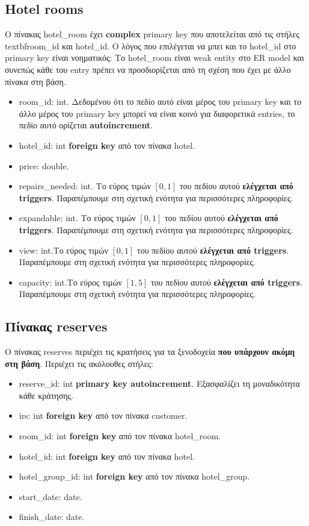 \documentclass[a4paper,oneside, 11pt]{article}
\begin{document}
\subsection{Hotel rooms}
Ο πίνακας hotel\_room έχει \textbf{complex} primary key που αποτελείται από τις στήλες \\textbf{room\_id και hotel\_id}. Ο λόγος που επιλέγεται να μπει και το hotel\_id στο primary key είναι νοηματικός: Το hotel\_room είναι weak entity στο ER model και συνεπώς κάθε του entry πρέπει να προσδιορίζεται από τη σχέση που έχει με άλλο πίνακα στη βάση.
\begin{itemize}
\item room\_id: int. Δεδομένου ότι το πεδίο αυτό είναι μέρος του primary key και το άλλο μέρος του primary key μπορεί να είναι κοινό για διαφορετικά entries, το πεδίο αυτό ορίζεται\textbf{ autoincrement}.
\item hotel\_id: int \textbf{foreign key} από τον πίνακα hotel.
\item price: double.
\item repairs\_needed: int. Το εύρος τιμών $[0,1]$ του πεδίου αυτού \textbf{ελέγχεται από triggers}. Παραπέμπουμε στη σχετική ενότητα για περισσότερες πληροφορίες.
\item expandable: int. Το εύρος τιμών $[0,1]$ του πεδίου αυτού \textbf{ελέγχεται από triggers}. Παραπέμπουμε στη σχετική ενότητα για περισσότερες πληροφορίες.
\item view: int.Το εύρος τιμών $[0,1]$ του πεδίου αυτού \textbf{ελέγχεται από triggers}. Παραπέμπουμε στη σχετική ενότητα για περισσότερες πληροφορίες.
\item capacity: int.Το εύρος τιμών $[1,5]$ του πεδίου αυτού \textbf{ελέγχεται από triggers}. Παραπέμπουμε στη σχετική ενότητα για περισσότερες πληροφορίες.
\end{itemize}




\subsection{Πίνακας reserves}
Ο πίνακας reserves περιέχει τις κρατήσεις για τα ξενοδοχεία \textbf{που υπάρχουν ακόμη στη βάση}. Περιέχει τις ακόλουθες στήλες:

\begin{itemize}
\item reserve\_id: int \textbf{primary key autoincrement}. Εξασφαλίζει τη μοναδικότητα κάθε κράτησης.
\item irs: int \textbf{foreign key} από τον πίνακα customer.
\item room\_id: int \textbf{foreign key} από τον πίνακα hotel\_room.
\item hotel\_id: int \textbf{foreign key} από τον πίνακα hotel.
\item hotel\_group\_id: int \textbf{foreign key} από τον πίνακα hotel\_group.
\item start\_date: date.
\item finish\_date: date.
\end{itemize}
\end{document}
